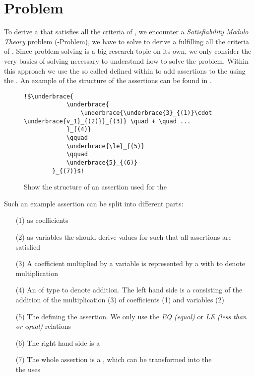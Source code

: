 \section{ Problem}
\label{sec:smt-problem}
To derive a \gna that satisfies all the criteria of , we encounter a \textit{Satisfiability Modulo Theory} problem (-Problem), we have to solve to derive a \gna fulfilling all the criteria of . Since  problem solving is a big research topic on its own, we only consider the very basics of  solving necessary to understand how to solve the problem. \newline
Within this approach we use the so called  defined within \aprove to add assertions to the \solver using the \smtfactory. An example of the structure of the assertions can be found in . %

\begin{figure}[H]
	\begin{lstlisting}[escapechar = !]
		!$\underbrace{
			\underbrace{
				\underbrace{\underbrace{3}_{(1)}\cdot \underbrace{v_1}_{(2)}}_{(3)} \quad + \quad ...
			}_{(4)} 
			\qquad
			\underbrace{\le}_{(5)}
			\qquad
			\underbrace{5}_{(6)}
		}_{(7)}$!
	\end{lstlisting}
	\caption{Show the structure of an assertion used for the \solver}
	\label{ex:assertion-structure}
\end{figure}

Such an example assertion can be split into different parts: 
\begin{enumerate}
	\item[(1)]  as coefficients
	\item[(2)]  as variables the \solver should derive values for such that all assertions are satisfied
	\item[(3)] A coefficient multiplied by a variable is represented by a  with   to denote multiplication
	\item[(4)] An  of type  to denote addition. The left hand side is a  consisting of the addition of the multiplication (3) of coefficients (1) and variables (2)
	\item[(5)] The  defining the assertion. We only use the \textit{EQ (equal)} or \textit{LE (less than or equal)} relations
	\item[(6)] The right hand side is a 
	\item[(7)] The whole assertion is a , which can be transformed into the \\  the \solver uses
\end{enumerate}

